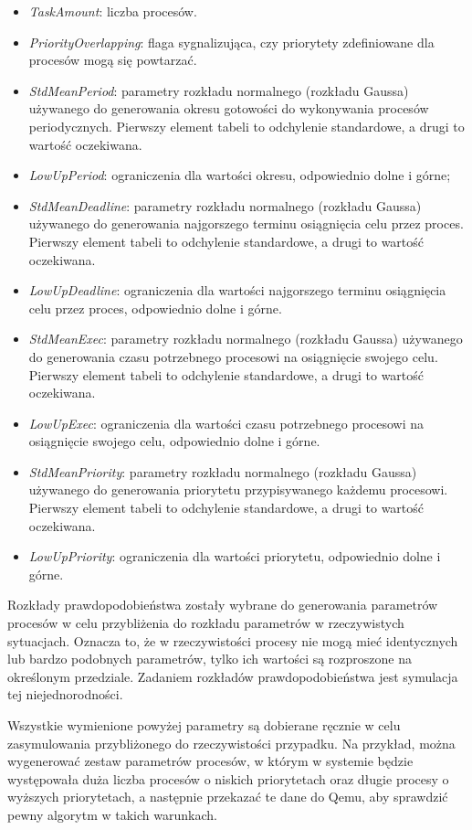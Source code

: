 \documentclass[../../main]{subfiles}
\begin{document}
\begin{itemize}
    \item \textit{TaskAmount}: liczba procesów.
    \item \textit{PriorityOverlapping}: flaga sygnalizująca, czy priorytety zdefiniowane dla procesów mogą się powtarzać.
    \item \textit{StdMeanPeriod}: parametry rozkładu normalnego (rozkładu Gaussa) używanego do generowania okresu gotowości do wykonywania procesów periodycznych. Pierwszy element tabeli to odchylenie standardowe, a drugi to wartość oczekiwana.
    \item \textit{LowUpPeriod}: ograniczenia dla wartości okresu, odpowiednio dolne i górne;
    \item \textit{StdMeanDeadline}: parametry rozkładu normalnego (rozkładu Gaussa) używanego do generowania najgorszego terminu osiągnięcia celu przez proces. Pierwszy element tabeli to odchylenie standardowe, a drugi to wartość oczekiwana.
    \item \textit{LowUpDeadline}: ograniczenia dla wartości najgorszego terminu osiągnięcia celu przez proces, odpowiednio dolne i górne.
    \item \textit{StdMeanExec}: parametry rozkładu normalnego (rozkładu Gaussa) używanego do generowania czasu potrzebnego procesowi na osiągnięcie swojego celu. Pierwszy element tabeli to odchylenie standardowe, a drugi to wartość oczekiwana.
    \item \textit{LowUpExec}: ograniczenia dla wartości czasu potrzebnego procesowi na osiągnięcie swojego celu, odpowiednio dolne i górne.
    \item \textit{StdMeanPriority}: parametry rozkładu normalnego (rozkładu Gaussa) używanego do generowania priorytetu przypisywanego każdemu procesowi. Pierwszy element tabeli to odchylenie standardowe, a drugi to wartość oczekiwana.
    \item \textit{LowUpPriority}: ograniczenia dla wartości priorytetu, odpowiednio dolne i górne.
\end{itemize}

Rozkłady prawdopodobieństwa zostały wybrane do generowania parametrów procesów w celu przybliżenia do rozkładu parametrów w rzeczywistych sytuacjach. Oznacza to, że w rzeczywistości procesy nie mogą mieć identycznych lub bardzo podobnych parametrów, tylko ich wartości są rozproszone na określonym przedziale. Zadaniem rozkładów prawdopodobieństwa jest symulacja tej niejednorodności.

Wszystkie wymienione powyżej parametry są dobierane ręcznie w celu zasymulowania przybliżonego do rzeczywistości przypadku. Na przykład, można wygenerować zestaw parametrów procesów, w którym w systemie będzie występowała duża liczba procesów o niskich priorytetach oraz długie procesy o wyższych priorytetach, a następnie przekazać te dane do Qemu, aby sprawdzić pewny algorytm w takich warunkach.
\end{document}
